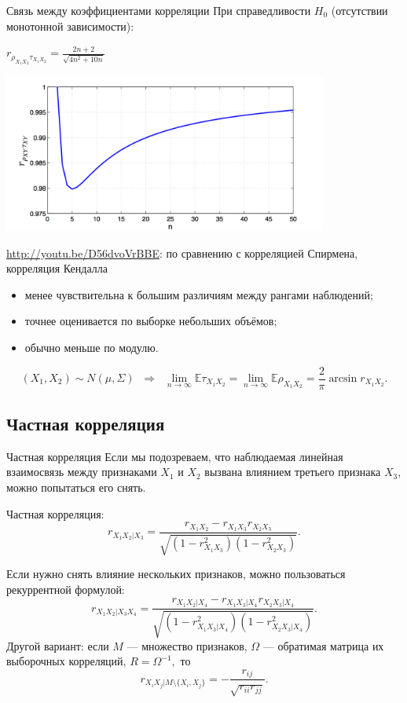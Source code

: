 \documentclass[9pt,pdf,utf8,hyperref={unicode},aspectratio=169]{beamer}
\begin{document}
\begin{frame}{Связь между коэффициентами корреляции}
	При справедливости $H_0$ (отсутствии монотонной зависимости):
	
	\begin{minipage}{0.39\textwidth}
		$r_{\rho_{X_1X_2}\tau_{X_1X_2}} = \frac{2n+2}{\sqrt{4n^2+10n}}$
	\end{minipage}%
	\begin{minipage}{0.6\textwidth}
		\includegraphics[width=0.8\textwidth]{corrcorr.png}
	\end{minipage}
	
	\vspace{5pt}
	
	\url{http://youtu.be/D56dvoVrBBE}: по сравнению с корреляцией Спирмена, корреляция Кендалла
	\begin{itemize}
		\item менее чувствительна к большим различиям между рангами наблюдений;
		\item точнее оценивается по выборке небольших объёмов;
		\item обычно меньше по модулю.
	\end{itemize}
	
	$$\left(X_{1},X_{2}\right)\sim N\left(\mu,\Sigma\right) \;\; \Rightarrow\;\;\lim_{n\rightarrow\infty} \mathbb{E} \tau_{X_1X_2} = \lim_{n\rightarrow\infty} \mathbb{E} \rho_{X_1X_2} = \frac{2}{\pi} \arcsin r_{X_1X_2}.$$
\end{frame}

\subsection{Частная корреляция}
\begin{frame}{Частная корреляция}
	Если мы подозреваем, что наблюдаемая линейная взаимосвязь между признаками $X_1$ и $X_2$ вызвана влиянием третьего признака $X_3$, можно попытаться его снять.
	
	Частная корреляция:
	$$r_{X_1X_2|X_3} = \frac{r_{X_1X_2} - r_{X_1X_3} r_{X_2X_3}}{\sqrt{\left(1-r_{X_1X_3}^2\right)\left(1-r_{X_2X_3}^2\right)}}.$$
	
	Если нужно снять влияние нескольких признаков, можно пользоваться рекуррентной формулой:
	$$r_{X_1X_2|X_3X_4} = \frac{r_{X_1X_2|X_4} - r_{X_1X_3|X_4} r_{X_2X_3|X_4}}{\sqrt{\left(1-r_{X_1X_3|X_4}^2\right)\left(1-r_{X_2X_3|X_4}^2\right)}}.$$
	Другой вариант: если $M$ --- множество признаков, $\Omega$ --- обратимая матрица их выборочных корреляций, $R=\Omega^{-1},$ то
	$$r_{X_iX_j|M \setminus \{X_i,X_j\}} = - \frac{r_{ij}}{\sqrt{r_{ii}r_{jj}}}.$$
\end{frame}
\end{document}
